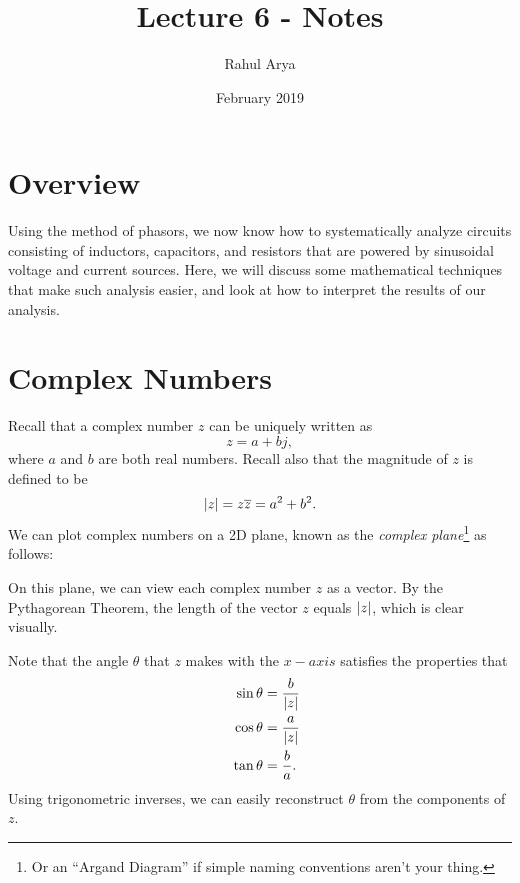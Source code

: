 \documentclass[letterpaper]{article}
\title{Lecture 6 - Notes}
\author{Rahul Arya}
\date{February 2019}
\theoremstyle{remark}
\DeclarePairedDelimiter\abs{\lvert}{\rvert}%
\newcommand{\eqn}[1]{\begin{alignat*}{2}#1\end{alignat*}}
\begin{document}
\maketitle

\section{Overview}
Using the method of phasors, we now know how to systematically analyze circuits consisting of inductors, capacitors, and resistors that are powered by sinusoidal voltage and current sources. Here, we will discuss some mathematical techniques that make such analysis easier, and look at how to interpret the results of our analysis.

\section{Complex Numbers}
Recall that a complex number $z$ can be uniquely written as
\[
    z = a + bj,
\]
where $a$ and $b$ are both real numbers. Recall also that the magnitude of $z$ is defined to be
\[
    \abs{z} = z\overline{z} = a^2 + b^2.
\]
We can plot complex numbers on a 2D plane, known as the \emph{complex plane}\footnote{Or an ``Argand Diagram'' if simple naming conventions aren't your thing.} as follows:
\begin{center}
\end{center}
On this plane, we can view each complex number $z$ as a vector. By the Pythagorean Theorem, the length of the vector $z$ equals $\abs{z}$, which is clear visually.

Note that the angle $\theta$ that $z$ makes with the $x-axis$ satisfies the properties that
\eqn{
    && \sin{\theta} &= \frac{b}{\abs{z}} \\
    && \cos{\theta} &= \frac{a}{\abs{z}} \\
    && \tan{\theta} &= \frac{b}{a}. \\
}
Using trigonometric inverses, we can easily reconstruct $\theta$ from the components of $z$.
\end{document}
